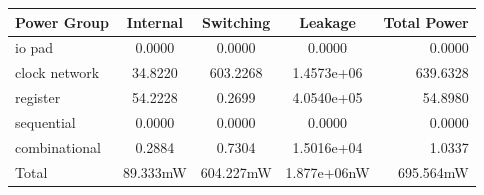 \documentclass[journal,comsoc]{IEEEtran}
\begin{document}
\begin{table}[t!]
	\begin{tabular}{@{}lcccr@{}}\\
		Power Group		 &Internal 	&Switching 	&Leakage		&Total Power\\
		\hline\hline
		io pad           &0.0000    &0.0000     &0.0000    		&0.0000\\
		clock network    &34.8220   &603.2268   &1.4573e+06 	&639.6328\\
		register         &54.2228   &0.2699     &4.0540e+05 	&54.8980\\  
		sequential       &0.0000    &0.0000     &0.0000     	&0.0000\\  
		combinational    &0.2884    &0.7304     &1.5016e+04 	&1.0337\\ 
		\hline
		Total            &89.333mW  &604.227mW  &1.877e+06nW	&695.564mW\\	
		\hline
	\end{tabular}
\end{table}
\end{document}
